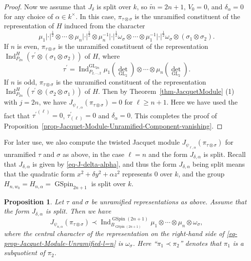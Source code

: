\documentclass[12pt]{amsart}
\newcommand{\wt}{\widetilde}
\newtheorem{proposition}[theorem]{Proposition}%
\theoremstyle{remark}
\DeclareMathOperator{\Ind}{Ind}
\DeclareMathOperator{\GL}{GL}
\DeclareMathOperator{\GSpin}{GSpin}
\begin{document}
\begin{proof}
Now we assume that  $J_{\delta}$ is split over $k$, so $\wt m=2n+1$, $V_0=0$, and $\delta_{\alpha}=0$ for any choice of $\alpha\in k^\times$.  
In this case, $\pi_{\tau\otimes \sigma}$ is the unramified constituent of the representation of $H$ induced from the character 
\begin{equation}
\label{eq-Jacquet-Module-Unramified-Component-eq3}
 \mu_1|\cdot|^{\frac{1}{2}}\otimes\cdots \otimes\mu_n|\cdot|^{\frac{1}{2}}\otimes \mu_n^{-1}|\cdot|^{\frac{1}{2}}\omega_{\sigma} \otimes \cdots \otimes   \mu_1^{-1}|\cdot|^{\frac{1}{2}}\omega_{\sigma}\otimes (\sigma_1\otimes\sigma_2).
 \end{equation}
If $n$ is even,  $\pi_{\tau\otimes \sigma}$ is the unramified constituent of the representation $\Ind_{P_{2n}}^{H}(\tau^\prime \otimes (\sigma_1\otimes\sigma_2))$ of $H$, where
\begin{equation}
\label{eq-prop-Jacquet-Module-Unramified-Component-eq4}
	\tau^\prime= \Ind_{P_{2, \cdots, 2}}^{\GL_{2n}} \mu_1 ({\det}_{\GL_2}) \otimes \cdots \otimes \mu_n ({\det}_{\GL_2})  .
\end{equation}
If $n$ is odd, $\pi_{\tau\otimes \sigma}$ is the unramified constituent of the representation $\Ind_{P_{2n}}^{H}(\tau^\prime \otimes (\sigma_2\otimes\sigma_1))$ of $H$.
Then by Theorem~\ref{thm-JacquetModule} (1) with $j=2n$, we have $J_{\psi_{\ell,\alpha}}(\pi_{\tau\otimes \sigma})=0$ for $\ell\geq  n+1$. Here we have used the fact that ${\tau^\prime}^{(\ell)}=0$, $\tau^\prime_{(\ell)}=0$ and $\delta_{\alpha}=0$. This completes the proof of Proposition~\ref{prop-Jacquet-Module-Unramified-Component-vanishing}.
\end{proof}



For later use, we also compute the twisted Jacquet module $J_{\psi_{\ell,\alpha}}(\pi_{\tau\otimes \sigma})$ for unramified $\tau$ and $\sigma$ as above, in the case $\ell=n$ and the form $J_{\delta, \alpha}$ is split. Recall that $J_{\delta,\alpha}$ is given by \eqref{eq-J-delta-alpha}, and thus the form $J_{\delta, \alpha}$ being split means that the quadratic form $x^2+\delta y^2+\alpha z^2$ represents 0 over $k$, and the group $H_{n,w_0}=H_{n,\alpha}=\GSpin_{2n+1}$ is split over $k$. 

\begin{proposition}
\label{prop-Jacquet-Module-Unramified-l=n}
Let $\tau$ and $\sigma$ be unramified representations as above. Assume that the form $J_{\delta, \alpha}$ is split. Then we have
\begin{equation}
\label{eq-prop-Jacquet-Module-Unramified-l=n}
J_{\psi_{n,\alpha}}(\pi_{\tau\otimes \sigma})\prec \Ind_{B_{\GSpin(2n+1)}}^{\GSpin(2n+1)}  \mu_1\otimes \cdots \otimes \mu_n \otimes \omega_\sigma,
\end{equation}
where the central character of the representation on the right-hand side of \eqref{eq-prop-Jacquet-Module-Unramified-l=n} is $\omega_\sigma$. 
Here ``$\pi_1\prec\pi_2$'' denotes that $\pi_1$ is a subquotient of $\pi_2$. 
\end{proposition}
\end{document}
